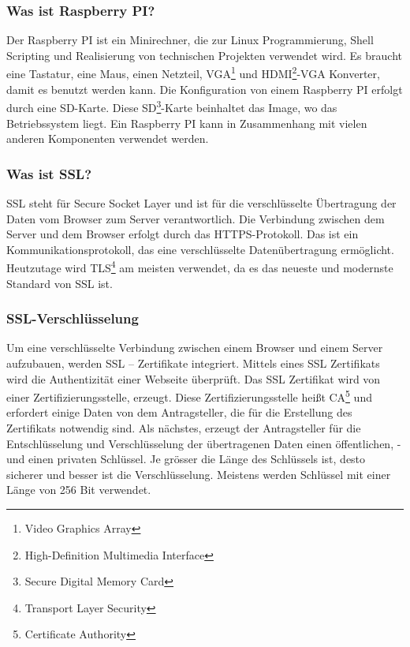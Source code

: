 \subsubsection{Was ist Raspberry PI?} 
Der Raspberry PI ist ein Minirechner, die zur Linux Programmierung, Shell Scripting und Realisierung von technischen Projekten verwendet wird. Es braucht eine Tastatur, eine Maus, einen Netzteil, VGA\footnote{Video Graphics Array} und HDMI\footnote{High-Definition Multimedia Interface}-VGA Konverter, damit es benutzt werden kann. Die Konfiguration von einem Raspberry PI erfolgt durch eine SD-Karte. Diese SD\footnote{Secure Digital Memory Card}-Karte beinhaltet das Image, wo das Betriebssystem liegt. Ein Raspberry PI kann in Zusammenhang mit vielen anderen Komponenten verwendet werden.\cite{50_raspi}
\subsubsection{Was ist SSL?} 
SSL steht für Secure Socket Layer und ist für die verschlüsselte Übertragung der Daten vom Browser zum Server verantwortlich. Die Verbindung zwischen dem Server und dem Browser erfolgt durch das HTTPS-Protokoll. Das ist ein Kommunikationsprotokoll, das eine verschlüsselte Datenübertragung ermöglicht. Heutzutage wird TLS\footnote{Transport Layer Security} am meisten verwendet, da es das neueste und modernste Standard von SSL ist.\cite{50_ssl}
\subsubsection{SSL-Verschlüsselung}
Um eine verschlüsselte Verbindung zwischen einem Browser und einem Server aufzubauen, werden SSL – Zertifikate integriert. Mittels eines SSL Zertifikats wird die Authentizität einer Webseite überprüft. Das SSL Zertifikat wird von einer Zertifizierungsstelle, erzeugt. Diese Zertifizierungsstelle heißt CA\footnote{Certificate Authority} und erfordert einige Daten von dem Antragsteller, die für die Erstellung des Zertifikats notwendig sind. Als nächstes, erzeugt der Antragsteller für die Entschlüsselung und Verschlüsselung der übertragenen Daten einen öffentlichen, -und einen privaten Schlüssel. Je grösser die Länge des Schlüssels ist, desto sicherer und besser ist die Verschlüsselung. Meistens werden Schlüssel mit einer Länge von 256 Bit verwendet.\cite{50_ssl}
